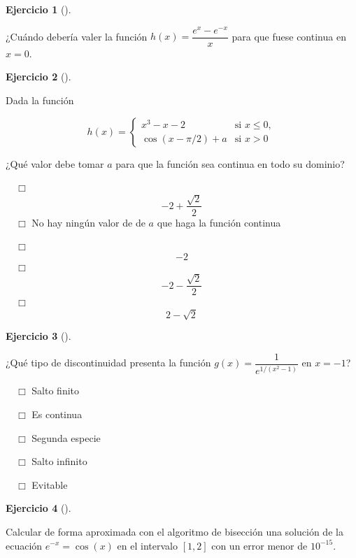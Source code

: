 \documentclass[
  a4paper,
]{scrreport}
\theoremstyle{definition}
\newtheorem{exercise}{Ejercicio}[chapter]
\theoremstyle{remark}
\begin{document}
\leavevmode{}%
\begin{exercise}[]\label{exr-discontinuidad-evitable}

¿Cuándo debería valer la función \(h(x)=\dfrac{e^x-e^{-x}}{x}\) para que
fuese continua en \(x=0\).

\vspace{18pt}

\end{exercise}

\leavevmode{}%
\begin{exercise}[]\label{exr-continuidad-2}

Dada la función

\[
h(x)=
\begin{cases}
x^3-x-2 & \mbox{si } x\leq 0,\\
\cos(x-\pi/2)+a & \mbox{si } x>0
\end{cases}
\]

¿Qué valor debe tomar \(a\) para que la función sea continua en todo su
dominio?

${\quad\Box}$ $$-2+\frac{\sqrt{2}}{2}$$
${\quad\Box}$ No hay ningún valor de de $a$ que haga la función continua

${\quad\Box}$ $$-2$$
${\quad\Box}$ $$-2 - \frac{\sqrt{2}}{2}$$
${\quad\Box}$ $$2-\sqrt{2}$$

\end{exercise}

\leavevmode{}%
\begin{exercise}[]\label{exr-clasificacion-discontinuidad}

¿Qué tipo de discontinuidad presenta la función
\(g(x)=\dfrac{1}{e^{1/(x^2-1)}}\) en \(x=-1\)?

${\quad\Box}$ Salto finito

${\quad\Box}$ Es continua

${\quad\Box}$ Segunda especie

${\quad\Box}$ Salto infinito

${\quad\Box}$ Evitable

\end{exercise}

\leavevmode{}%
\begin{exercise}[]\label{exr-raices}

Calcular de forma aproximada con el algoritmo de bisección una solución
de la ecuación \(e^{-x}=\cos(x)\) en el intervalo \([1,2]\) con un error
menor de \(10^{-15}\).

\vspace{18pt}

\end{exercise}
\end{document}
